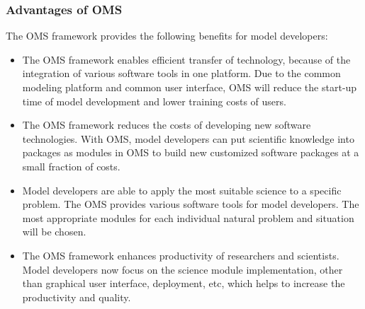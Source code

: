 \subsubsection{Advantages of OMS}
\par
The OMS framework provides the following benefits for model developers: \autocite{dsl:oms-ahuja}
\begin{itemize}
\item The OMS framework enables efficient transfer of technology, because of the  integration of various software tools in one platform. Due to the common modeling platform and common user interface, OMS will reduce the start-up time of model development and lower training costs of users.

\item The OMS framework reduces the costs of developing new software technologies. With OMS, model developers can put scientific knowledge into packages as modules in OMS to build new customized software packages at a small fraction of costs.

\item Model developers are able to apply the most suitable science to a specific problem. The OMS provides various software tools for model developers. The most appropriate modules for each individual natural problem and situation will be chosen.

\item The OMS framework enhances productivity of researchers and scientists. Model developers now focus on the science module implementation, other than graphical user interface, deployment, etc, which helps to increase the productivity and quality.

\end{itemize}

